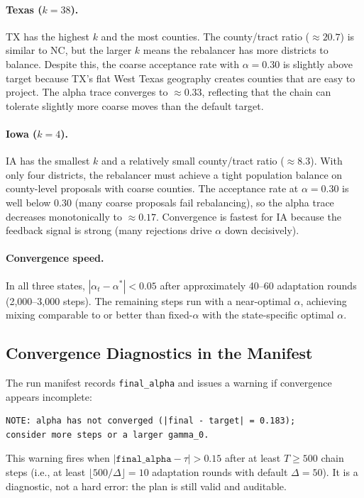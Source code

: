 \paragraph{Texas ($k = 38$).}
TX has the highest $k$ and the most counties.
The county/tract ratio ($\approx 20.7$) is similar to NC, but the larger $k$
means the rebalancer has more districts to balance.
Despite this, the coarse acceptance rate with $\alpha = 0.30$ is slightly
above target because TX's flat West Texas geography creates counties that
are easy to project.
The alpha trace converges to $\approx 0.33$, reflecting that the chain can
tolerate slightly more coarse moves than the default target.

\paragraph{Iowa ($k = 4$).}
IA has the smallest $k$ and a relatively small county/tract ratio ($\approx 8.3$).
With only four districts, the rebalancer must achieve a tight population
balance on county-level proposals with coarse counties.
The acceptance rate at $\alpha = 0.30$ is well below 0.30 (many coarse
proposals fail rebalancing), so the alpha trace decreases monotonically to
$\approx 0.17$.
Convergence is fastest for IA because the feedback signal is strong (many
rejections drive $\alpha$ down decisively).

\paragraph{Convergence speed.}
In all three states, $|\alpha_t - \alpha^*| < 0.05$ after approximately
40--60 adaptation rounds (2{,}000--3{,}000 steps).
The remaining steps run with a near-optimal $\alpha$, achieving mixing
comparable to or better than fixed-$\alpha$ \ms{} with the state-specific
optimal $\alpha$.

\subsection{Convergence Diagnostics in the Manifest}

The run manifest records \texttt{final\_alpha} and issues a warning if
convergence appears incomplete:
\begin{verbatim}
NOTE: alpha has not converged (|final - target| = 0.183);
consider more steps or a larger gamma_0.
\end{verbatim}
This warning fires when $|\texttt{final\_alpha} - \tau| > 0.15$ after at least
$T \ge 500$ chain steps (i.e., at least $\lfloor 500/\Delta \rfloor = 10$
adaptation rounds with default $\Delta = 50$).
It is a diagnostic, not a hard error: the plan is still valid and auditable.
